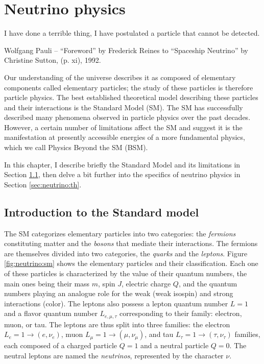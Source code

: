 \documentclass[../main.tex]{subfiles}
\begin{document}
\chapter{Neutrino physics}
\label{sec:neutrino}

\epigraph{I have done a terrible thing, I have postulated a particle that cannot be detected.}{Wolfgang Pauli -- ``Foreword'' by Frederick Reines to ``Spaceship Neutrino'' by Christine Sutton, (p. xi), 1992. }



\minitoc

Our understanding of the universe describes it as composed of elementary components called elementary particles; the study of these particles is therefore particle physics. The best established theoretical model describing these particles and their interactions is the Standard Model (SM).
The SM has successfully described many phenomena observed in particle physics over the past decades. However, a certain number of limitations affect the SM and suggest it is the manifestation at presently accessible energies of a more fundamental physics, which we call Physics Beyond the SM (BSM).

In this chapter, I describe briefly the Standard Model and its limitations in Section \ref{sec:neutrinos:sm}, then delve a bit further into the specifics of neutrino physics in Section \ref{sec:neutrino:th}.

\section{Introduction to the Standard model}
\label{sec:neutrinos:sm}

The SM categorizes elementary particles into two categories: the \textit{fermions} constituting matter and the \textit{bosons} that mediate their interactions. The fermions are themselves divided into two categories, the \textit{quarks} and the \textit{leptons}. Figure \ref{fig:neutrino:sm} shows the elementary particles and their classification. Each one of these particles is characterized by the value of their quantum numbers, the main ones being their mass $m$, spin $J$, electric charge $Q$, and the quantum numbers playing an analogue role for the weak (weak isospin) and strong interactions (color). The leptons also possess a lepton quantum number $L = 1$ and a flavor quantum number $L_{e,\mu,\tau}$ corresponding to their family: electron, muon, or tau. The leptons are thus split into three families: the electron $L_e = 1 \rightarrow (e, \nu_e)$, muon $L_\mu = 1 \rightarrow (\mu, \nu_\mu)$, and tau $L_\tau = 1 \rightarrow (\tau, \nu_\tau)$ families, each composed of a charged particle $Q = 1$ and a neutral particle $Q = 0$. The neutral leptons are named the \textit{neutrinos}, represented by the character $\nu$.
\end{document}
